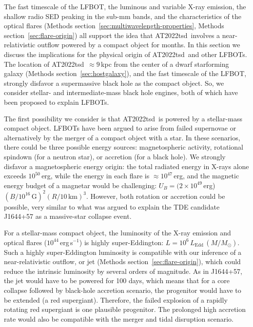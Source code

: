 \documentclass{nature_plusfigure}
\newcommand{\at}{AT2022tsd}
\begin{document}
\begin{methods}
The fast timescale of the LFBOT, the luminous and variable X-ray emission, the shallow radio SED peaking in the sub-mm bands, and the characteristics of the optical flares (Methods section~\ref{sec:multiwavelength-properties}, Methods section~\ref{sec:flare-origin}) all support the idea that \at\ involves a near-relativistic outflow powered by a compact object for months. In this section we discuss the implications for the physical origin of \at\ and other LFBOTs. The location of \at\ $\approx9\,$kpc from the center of a dwarf starforming galaxy (Methods section~\ref{sec:hostgalaxy}), and the fast timescale of the LFBOT, strongly disfavor a supermassive black hole as the compact object. So, we consider stellar- and intermediate-mass black hole engines, both of which have been proposed to explain LFBOTs\cite{Perley2019,Margutti2019,Metzger2022,Chen2023}. 

The first possibility we consider is that \at\ is powered by a stellar-mass compact object. LFBOTs have been argued to arise from failed supernovae\cite{Perley2019,Margutti2019} or alternatively by the merger of a compact object with a star\cite{Metzger2022}. In these scenarios, there could be three possible energy sources: magnetospheric activity, rotational spindown (for a neutron star), or accretion (for a black hole). We strongly disfavor a magnetospheric energy origin: the total radiated energy in X-rays alone exceeds $10^{50}\,$erg, while the energy in each flare is $\approx10^{47}\,$erg, and the magnetic energy budget of a magnetar would be challenging: $U_B = (2\times10^{49}\,$erg)$(B/10^{16}\,\mathrm{G})^2 (R/10\,\mathrm{km})^3$. However, both rotation or accretion could be possible, very similar to what was argued to explain the TDE candidate J1644+57 as a massive-star collapse event\cite{Quataert2012}. 

For a stellar-mass compact object, the luminosity of the X-ray emission and optical flares ($10^{44}\,$erg\,s$^{-1}$) is highly super-Eddington: $L=10^{6}\,L_\mathrm{Edd}\,(M/M_\odot)$. Such a highly super-Eddington luminosity is compatible with our inference of a near-relativistic outflow, or jet (Methods section~\ref{sec:flare-origin}), which could reduce the intrinsic luminosity by several orders of magnitude. As in J1644+57, the jet would have to be powered for 100 days, which means that for a core collapse followed by black-hole accretion scenario, the progenitor would have to be extended (a red supergiant\cite{Quataert2012}). Therefore, the failed explosion of a rapidly rotating red supergiant is one plausible progenitor. The prolonged high accretion rate would also be compatible with the merger and tidal disruption scenario\cite{Metzger2022}.


\end{methods}
\end{document}

